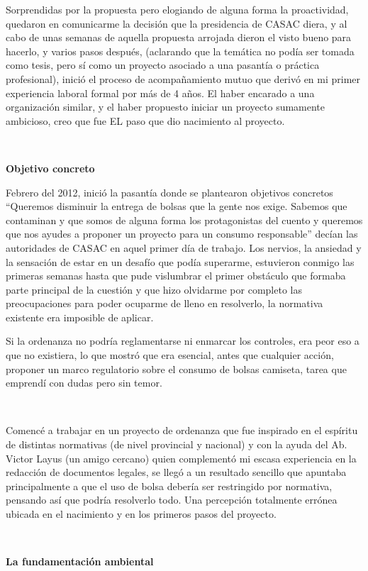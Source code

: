 \begin{fullwidth}
Sorprendidas por la propuesta pero elogiando de alguna forma la
proactividad, quedaron en comunicarme la decisión que la presidencia de
CASAC diera, y al cabo de unas semanas de aquella propuesta arrojada
dieron el visto bueno para hacerlo, y varios pasos después, (aclarando
que la temática no podía ser tomada como tesis, pero sí como un proyecto
asociado a una pasantía o práctica profesional), inició el proceso de
acompañamiento mutuo que derivó en mi primer experiencia laboral formal
por más de 4 años. El haber encarado a una organización similar, y el
haber propuesto iniciar un proyecto sumamente ambicioso, creo que fue EL
paso que dio nacimiento al proyecto.

~

\textbf{Objetivo concreto}

Febrero del 2012, inició la pasantía donde se plantearon objetivos
concretos ``Queremos disminuir la entrega de bolsas que la gente nos
exige. Sabemos que contaminan y que somos de alguna forma los
protagonistas del cuento y queremos que nos ayudes a proponer un
proyecto para un consumo responsable'' decían las autoridades de CASAC
en aquel primer día de trabajo. Los nervios, la ansiedad y la sensación
de estar en un desafío que podía superarme, estuvieron conmigo las
primeras semanas hasta que pude vislumbrar el primer obstáculo que
formaba parte principal de la cuestión y que hizo olvidarme por completo
las preocupaciones para poder ocuparme de lleno en resolverlo, la
normativa existente era imposible de aplicar.

Si la ordenanza no podría reglamentarse ni enmarcar los controles, era
peor eso a que no existiera, lo que mostró que era esencial, antes que
cualquier acción, proponer un marco regulatorio sobre el consumo de
bolsas camiseta, tarea que emprendí con dudas pero sin temor.

~

Comencé a trabajar en un proyecto de ordenanza que fue inspirado en el
espíritu de distintas normativas (de nivel provincial y nacional) y con
la ayuda del Ab. Victor Layus (un amigo cercano) quien complementó mi
escasa experiencia en la redacción de documentos legales, se llegó a un
resultado sencillo que apuntaba principalmente a que el uso de bolsa
debería ser restringido por normativa, pensando así que podría
resolverlo todo. Una percepción totalmente errónea ubicada en el
nacimiento y en los primeros pasos del proyecto.

~

\textbf{La fundamentación ambiental}


\end{fullwidth}
